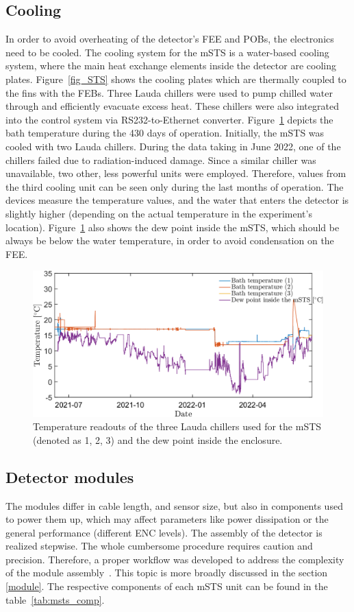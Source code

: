 \subsection{Cooling}
\label{msts_cooling}
In order to avoid overheating of the detector's \gls{FEE} and \glspl{POB}, the electronics need to be cooled. The cooling system for the \gls{mSTS} is a water-based cooling system, where the main heat exchange elements inside the detector are cooling plates.  Figure~\ref{fig_STS} shows the cooling plates which are thermally coupled to the fins with the \glspl{FEB}. Three Lauda chillers were used to pump chilled water through and efficiently evacuate excess heat. These chillers were also integrated into the control system via RS232-to-Ethernet converter. Figure~\ref{fig_cooling} depicts the bath temperature during the 430 days of operation. Initially, the \gls{mSTS} was cooled with two Lauda chillers. During the data taking in June 2022, one of the chillers failed due to radiation-induced damage. Since a similar chiller was unavailable, two other, less powerful units were employed. Therefore, values from the third cooling unit can be seen only during the last months of operation. The devices measure the temperature values, and the water that enters the detector is slightly higher (depending on the actual temperature in the experiment's location). Figure~\ref{fig_cooling} also shows the dew point inside the \gls{mSTS}, which should be always be below the water temperature, in order to avoid condensation on the \gls{FEE}.

\begin{figure}[!h]
\centering
\includegraphics[width=0.95\columnwidth]{Chapter6/DCS/images/cooling.png}
\caption{Temperature readouts of the three Lauda chillers used for the \gls{mSTS} (denoted as 1, 2, 3) and the dew point inside the enclosure.}
\label{fig_cooling}
\end{figure}
\newpage
\subsection{Detector modules}
 The modules differ in cable length, and sensor size, but also in components used to power them up, which may affect parameters like power dissipation or the general performance (different ENC levels).  The assembly of the detector is realized stepwise. The whole cumbersome procedure requires caution and precision. Therefore, a proper workflow was developed to address the complexity of the module assembly~\cite{carmen2}. This topic is more broadly discussed in the section \ref{module}. The respective components of each \gls{mSTS} unit can be found in the table~\ref{tab:msts_comp}. 

